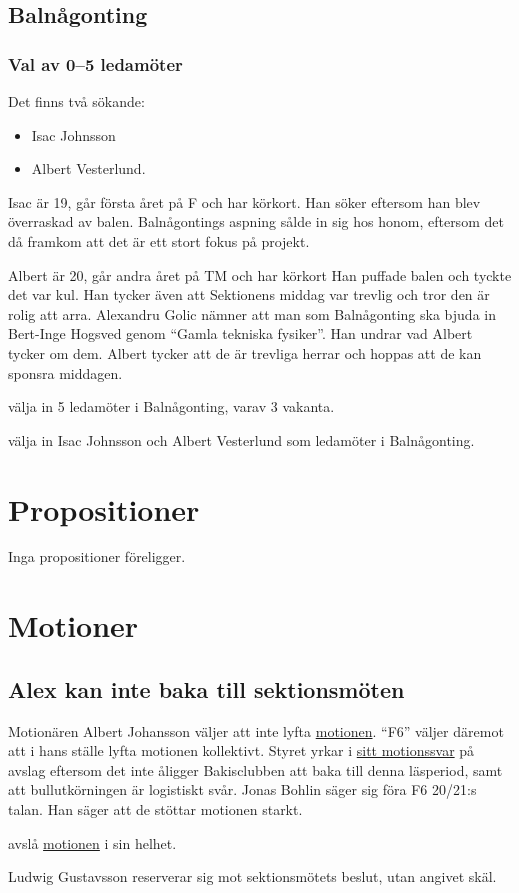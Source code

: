 \documentclass[hidelinks]{../sektionsmote} %
\begin{document}
\subsection{Balnågonting}

\subsubsection{Val av 0--5 ledamöter}
Det finns två sökande:
\begin{itemize}
    \item Isac Johnsson
    \item Albert Vesterlund.
\end{itemize}

Isac är 19, går första året på F och har körkort.
Han söker eftersom han blev överraskad av balen.
Balnågontings aspning sålde in sig hos honom, eftersom det då framkom att det är ett stort fokus på projekt.

Albert är 20, går andra året på TM och har körkort
Han puffade balen och tyckte det var kul.
Han tycker även att Sektionens middag var trevlig och tror den är rolig att arra.
Alexandru Golic nämner att man som Balnågonting ska bjuda in Bert-Inge Hogsved genom \enquote{Gamla tekniska fysiker}.
Han undrar vad Albert tycker om dem.
Albert tycker att de är trevliga herrar och hoppas att de kan sponsra middagen.
\begin{beslut}
    \item välja in 5 ledamöter i Balnågonting, varav 3 vakanta.
    \item välja in Isac Johnsson och Albert Vesterlund som ledamöter i Balnågonting.
\end{beslut}

\section{Propositioner}
Inga propositioner föreligger.

\section{Motioner}

\subsection{Alex kan inte baka till sektionsmöten}
Motionären Albert Johansson väljer att inte lyfta \hyperlink{bilagor/motion/a.pdf.1}{motionen}.
\enquote{F6} väljer däremot att i hans ställe lyfta motionen kollektivt.
Styret yrkar i \hyperlink{bilagor/motion/a-svar.pdf.1}{sitt motionssvar} på avslag eftersom det inte åligger Bakisclubben att baka till denna läsperiod, samt att bullutkörningen är logistiskt svår.
Jonas Bohlin säger sig föra F6 20/21:s talan.
Han säger att de stöttar motionen starkt.
\begin{beslut}
    \item avslå \hyperlink{bilagor/motion/a.pdf.1}{motionen} i sin helhet.
\end{beslut}
Ludwig Gustavsson reserverar sig mot sektionsmötets beslut, utan angivet skäl.
\end{document}
